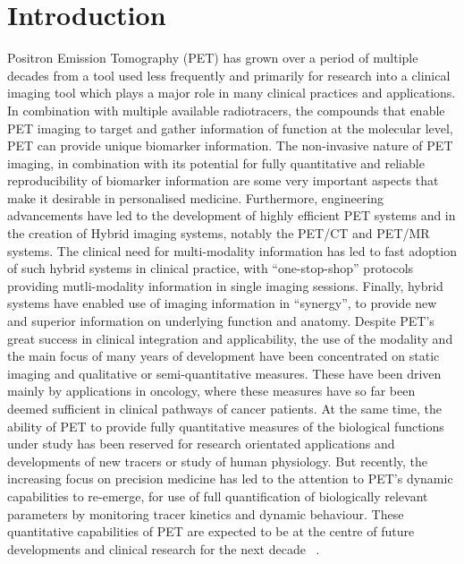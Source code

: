 \chapter{Introduction}
Positron Emission Tomography (PET) has grown over a period of multiple decades from a tool used less frequently and primarily for research into a clinical imaging tool which plays a major role in many clinical practices and applications. 
In combination with multiple available radiotracers, the compounds that enable PET imaging to target and gather information of function at the molecular level, PET can provide unique biomarker information. The non-invasive nature of PET imaging, in combination with its potential for fully quantitative and reliable reproducibility of biomarker information are some very important aspects that make it desirable in personalised medicine. 
Furthermore, engineering advancements have led to the development of highly efficient PET systems and in the creation of Hybrid imaging systems, notably the PET/CT and PET/MR systems. The clinical need for multi-modality information has led to fast adoption of such hybrid systems in clinical practice, with “one-stop-shop” protocols providing mutli-modality information in single imaging sessions. Finally, hybrid systems have enabled use of imaging information in “synergy”, to provide new and superior information on underlying function and anatomy. 
Despite PET’s great success in clinical integration and applicability, the use of the modality and the main focus of many years of development have been concentrated on static imaging and qualitative or semi-quantitative measures. These have been driven mainly by applications in oncology, where these measures have so far been deemed sufficient in clinical pathways of cancer patients. At the same time, the ability of PET to provide fully quantitative measures of the biological functions under study has been reserved for research orientated applications and developments of new tracers or study of human physiology. 
But recently, the increasing focus on precision medicine has led to the attention to PET’s dynamic capabilities to re-emerge, for use of full quantification of biologically relevant parameters by monitoring tracer kinetics and dynamic behaviour. These quantitative capabilities of PET are expected to be at the centre of future developments and clinical research for the next decade ~\cite{MeikleRoadmap}.

